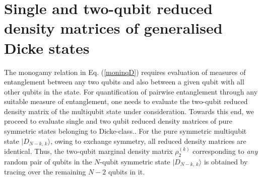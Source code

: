 \documentclass[pra,a4paper,showpacs,superscriptaddress]{revtex4}
\begin{document}
\section{Single and two-qubit reduced density matrices of generalised Dicke states} 
The monogamy relation in Eq. (\ref{moninqD}) requires evaluation of measures of entanglement between any two qubits and also between a given qubit with all other qubits in the state. For quantification of pairwise entanglement through any suitable measure of entanglement, one needs to evaluate the two-qubit reduced density matrix of the multiqubit state under consideration. Towards this end, 
we proceed to evaluate single and two qubit reduced density matrices of pure symmetric states belonging to Dicke-class..
For the pure symmetric multiqubit state  $\vert D_{N-k,\,k}\rangle$, owing to exchange symmetry, all reduced density matrices are identical. Thus, the two-qubit marginal density matrix $\rho^{(k)}_2$ corresponding to {\emph{any}} random pair of qubits in the $N$-qubit symmetric state $\vert D_{N-k,\,k}\rangle$  is obtained by tracing over the remaining $N-2$ qubits in it. 
\end{document}
